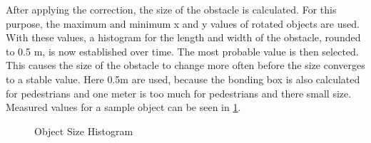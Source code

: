 \documentclass[11pt,oneside,openright]{mpreport}
\begin{document}

After applying the correction, the size of the obstacle is calculated. For this purpose, the maximum and minimum x and y values of
rotated objects are used. With these values, a histogram for the length and width of the obstacle, rounded to 0.5 m, is now established over time.
The most probable value is then selected. This causes the size of the obstacle to change more often before the size converges to a stable value.
Here 0.5m are used, because the bonding box is also calculated for pedestrians and one meter is too much for pedestrians and there small size.
Measured values for a sample object can be seen in \cref{obst_hist}.
\begin{figure}[!ht]
\begin{center}
\caption{Object Size Histogram}
\label{obst_hist}
\end{center}
\end{figure}
\end{document}
